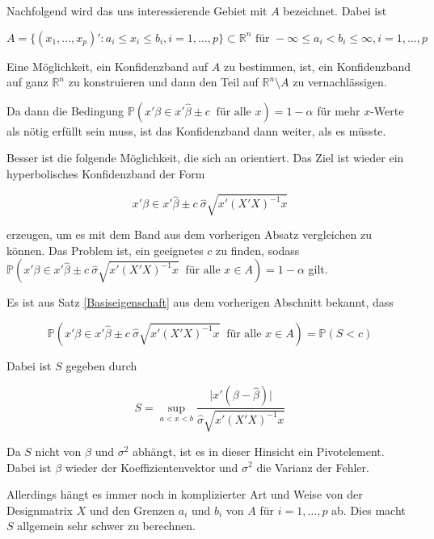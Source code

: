 \documentclass[12pt,a4paper]{article}
\theoremstyle{definition}
\theoremstyle{definition}
\theoremstyle{definition}
\begin{document}
Nachfolgend wird das uns interessierende Gebiet mit $A$ bezeichnet. Dabei ist 

\begin{equation*}
A = \{(x_1, \ldots, x_p)' : a_i \leq x_i \leq b_i, i = 1, \ldots, p \} \subset \mathbb{R}^n \text{ für } - \infty \leq a_i < b_i \leq \infty, i=1, \ldots, p
\end{equation*}

Eine Möglichkeit, ein Konfidenzband auf $A$ zu bestimmen, ist, ein Konfidenzband auf ganz $\mathbb{R}^n$ zu konstruieren und dann den Teil auf $\mathbb{R}^{n} \setminus A$ zu vernachlässigen.

Da dann die Bedingung $\mathbb{P}(x'\beta \in x' \hat{\beta} \pm c ~ \text{ für alle } x) = 1-\alpha$ für mehr $x$-Werte als nötig erfüllt sein muss, ist das Konfidenzband dann weiter, als es müsste.

Besser ist die folgende Möglichkeit, die sich an \cite[70]{Liu64} orientiert. Das Ziel ist wieder ein hyperbolisches Konfidenzband der Form 

\begin{equation}
x'\beta \in x' \hat{\beta} \pm c ~ \hat{\sigma} \sqrt{x' (X'X)^{-1}x} \label{hyperbolisches_KB}
\end{equation}

erzeugen, um es mit dem Band aus dem vorherigen Absatz vergleichen zu können. Das Problem ist, ein geeignetes $c$ zu finden, sodass $\mathbb{P}( x'\beta \in x' \hat{\beta} \pm c ~ \hat{\sigma} \sqrt{x' (X'X)^{-1}x} ~ \text{ für alle } x \in A) = 1-\alpha$ gilt.

Es ist aus Satz \ref{Basiseigenschaft} aus dem vorherigen Abschnitt bekannt, dass 

\begin{equation*}
\mathbb{P}( x'\beta \in x' \hat{\beta} \pm c ~ \hat{\sigma} \sqrt{x' (X'X)^{-1}x} ~ \text{ für alle } x \in A ) = \mathbb{P}(S<c)
\end{equation*}

Dabei ist $S$ gegeben durch 

\begin{equation*}
S = \sup_{a<x<b} \frac{\vert x'(\beta - \hat{\beta}) \vert}{\hat{\sigma} \sqrt{x'(X'X)^{-1}x}}
\end{equation*}

Da $S$ nicht von $\beta$ und $\sigma^2$ abhängt, ist es in dieser Hinsicht ein Pivotelement. Dabei ist $\beta$ wieder der Koeffizientenvektor und $\sigma^2$ die Varianz der Fehler. 

Allerdings hängt es immer noch in komplizierter Art und Weise von der Designmatrix $X$ und den Grenzen $a_i$ und $b_i$ von $A$ für $i=1, \ldots, p$ ab. Dies macht $S$ allgemein sehr schwer zu berechnen.
\end{document}
